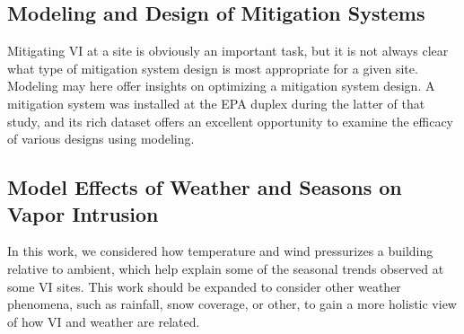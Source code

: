 \subsection{Modeling and Design of Mitigation Systems}

Mitigating VI at a site is obviously an important task, but it is not always clear what type of mitigation system design is most appropriate for a given site.
Modeling may here offer insights on optimizing a mitigation system design.
A mitigation system was installed at the EPA duplex during the latter of that study, and its rich dataset offers an excellent opportunity to examine the efficacy of various designs using modeling.\par

\subsection{Model Effects of Weather and Seasons on Vapor Intrusion}

In this work, we considered how temperature and wind pressurizes a building relative to ambient, which help explain some of the seasonal trends observed at some VI sites.
This work should be expanded to consider other weather phenomena, such as rainfall, snow coverage, or other, to gain a more holistic view of how VI and weather are related.\par
